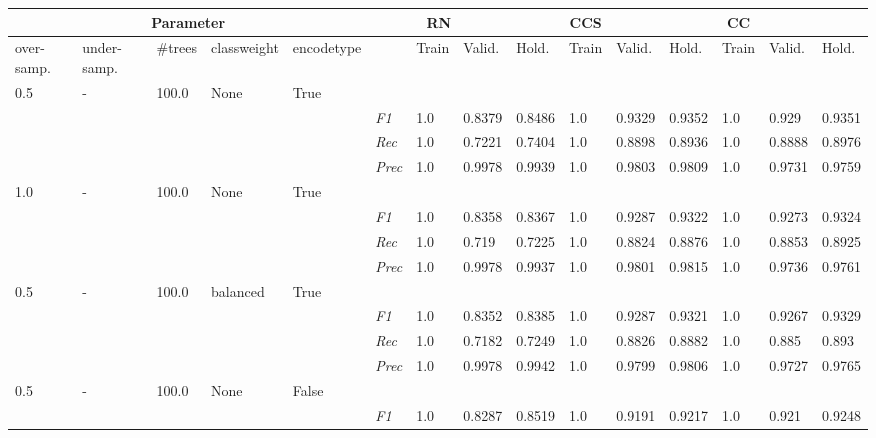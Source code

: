 \begin{table}[H]
    \tiny
    \tabcolsep=0.11cm
    \begin{tabularx}{\textwidth}{XXXXX|X|XXX|XXX|XXX}
    \toprule
    \multicolumn{5}{c}{Parameter} & \multicolumn{3}{c}{RN} & \multicolumn{3}{c}{CCS} & \multicolumn{3}{c}{CC} \\ \midrule
    over-\newline samp. & under-\newline samp. & \#trees & class\newline weight & encode\newline type  & & Train &  Valid. & Hold. & Train &  Valid. & Hold. & Train &  Valid. & Hold. \\ \midrule
    0.5 & - & 100.0 & None & True& & & & & & & & & \\
    & & & & & \textit{F1} & 1.0 & 0.8379 & 0.8486 & 1.0 & 0.9329        & 0.9352        & 1.0        & 0.929        & 0.9351        \\
    & & & & & \textit{Rec} & 1.0 & 0.7221 & 0.7404    & 1.0 & 0.8898    & 0.8936    & 1.0    & 0.8888    & 0.8976    \\
    & & & & & \textit{Prec} & 1.0 & 0.9978 & 0.9939 & 1.0 & 0.9803 & 0.9809 & 1.0 & 0.9731 & 0.9759 \\ \midrule
    1.0 & - & 100.0 & None & True& & & & & & & & & \\
    & & & & & \textit{F1} & 1.0 & 0.8358 & 0.8367 & 1.0 & 0.9287        & 0.9322        & 1.0        & 0.9273        & 0.9324        \\
    & & & & & \textit{Rec} & 1.0 & 0.719 & 0.7225    & 1.0 & 0.8824    & 0.8876    & 1.0    & 0.8853    & 0.8925    \\
    & & & & & \textit{Prec} & 1.0 & 0.9978 & 0.9937 & 1.0 & 0.9801 & 0.9815 & 1.0 & 0.9736 & 0.9761 \\ \midrule
    0.5 & - & 100.0 & balanced & True& & & & & & & & & \\
    & & & & & \textit{F1} & 1.0 & 0.8352 & 0.8385 & 1.0 & 0.9287        & 0.9321        & 1.0        & 0.9267        & 0.9329        \\
    & & & & & \textit{Rec} & 1.0 & 0.7182 & 0.7249    & 1.0 & 0.8826    & 0.8882    & 1.0    & 0.885    & 0.893    \\
    & & & & & \textit{Prec} & 1.0 & 0.9978 & 0.9942 & 1.0 & 0.9799 & 0.9806 & 1.0 & 0.9727 & 0.9765 \\ \midrule
    0.5 & - & 100.0 & None & False& & & & & & & & & \\
    & & & & & \textit{F1} & 1.0 & 0.8287 & 0.8519 & 1.0 & 0.9191        & 0.9217        & 1.0        & 0.921        & 0.9248        \\

\end{tabularx}
\end{table}
